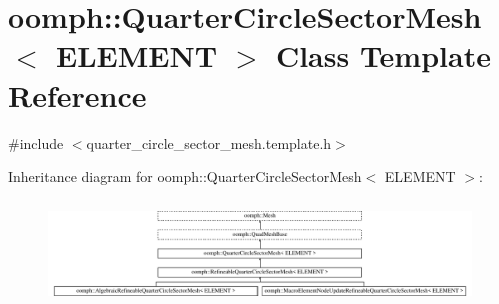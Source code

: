 \hypertarget{classoomph_1_1QuarterCircleSectorMesh}{}\section{oomph\+:\+:Quarter\+Circle\+Sector\+Mesh$<$ E\+L\+E\+M\+E\+NT $>$ Class Template Reference}
\label{classoomph_1_1QuarterCircleSectorMesh}


{\ttfamily \#include $<$quarter\+\_\+circle\+\_\+sector\+\_\+mesh.\+template.\+h$>$}

Inheritance diagram for oomph\+:\+:Quarter\+Circle\+Sector\+Mesh$<$ E\+L\+E\+M\+E\+NT $>$\+:\begin{figure}[H]
\begin{center}
\leavevmode
\includegraphics[height=2.794411cm]{classoomph_1_1QuarterCircleSectorMesh}
\end{center}
\end{figure}

